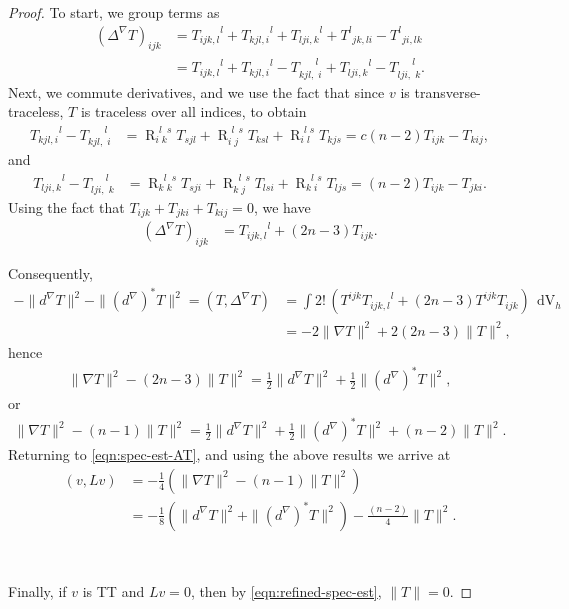 \documentclass[10pt,reqno]{amsart}
\DeclareMathOperator{\dvol}{dV}
\DeclareMathOperator{\R}{R}
\newcommand{\riem}{\R}
\newcommand{\riemdudu}[4]{\riem^{\phantom{#1} #2 \phantom{#3} #4}_{#1 \phantom{#2} #3}}
\begin{document}
\begin{proof}
To start, we group terms as 
\begin{align*}
(\Delta^\nabla T)_{ijk} &=   {T_{ijk,l}}^l + {T_{kjl,i}}^l + {T_{lji,k}}^l + {T^l}_{jk,li} -  {T^l}_{ji,lk} \nonumber \\
&=  {T_{ijk,l}}^l + {T_{kjl,i}}^l - T_{kjl,\phantom{l}i}^{\phantom{kjl,}l} + {T_{lji,k}}^l - T_{lji,\phantom{l}k}^{\phantom{lji,}l}.
\end{align*}
Next, we commute derivatives,  and we use the fact that since $v$ is transverse-traceless, $T$ is traceless over all indices, to obtain
\begin{align*}
{T_{kjl,i}}^l - T_{kjl,\phantom{l}i}^{\phantom{kjl,}l} &= \riemdudu{i}{l}{k}{s} T_{sjl} + \riemdudu{i}{l}{j}{s} T_{ksl} + \riemdudu{i}{l}{l}{s} T_{kjs} = c(n-2) T_{ijk} - T_{kij},
\end{align*}
and
\begin{align*}
{T_{lji,k}}^l - T_{lji,\phantom{l}k}^{\phantom{lji,}l} &= \riemdudu{k}{l}{k}{s} T_{sji} + \riemdudu{k}{l}{j}{s} T_{lsi} + \riemdudu{k}{l}{i}{s} T_{ljs} = (n-2) T_{ijk} - T_{jki}.
\end{align*}
Using the fact that $T_{ijk} + T_{jki} + T_{kij} = 0$, we have 
\begin{align*}
(\Delta^\nabla T)_{ijk} &=  {T_{ijk,l}}^l + (2n-3) T_{ijk}.
\end{align*}

Consequently, 
\begin{align*}
- \|d^\nabla T\|^2 - \|(d^\nabla)^* T\|^2 = (T,\Delta^\nabla T) &= \int 2! \, ( T^{ijk} {T_{ijk,l}}^l + (2n-3) T^{ijk} T_{ijk}  )\,  \dvol_h \nonumber \\
&= - 2 \| \nabla T \|^2 + 2 (2n-3) \|T\|^2,
\end{align*}
hence
\begin{align*}
\| \nabla T \|^2 - (2n-3) \|T\|^2 = \frac{1}{2} \|d^\nabla T\|^2 + \frac{1}{2} \|(d^\nabla)^*T\|^2, 
\end{align*}
or
\begin{align*}
\| \nabla T \|^2 - (n-1) \|T\|^2  = \frac{1}{2} \|d^\nabla T\|^2 + \frac{1}{2} \|(d^\nabla) ^*T\|^2 + (n-2) \|T\|^2. 
\end{align*}
Returning to \eqref{eqn:spec-est-AT}, and using the above results we arrive at
\begin{align} \label{eqn:refined-spec-est}
(v, Lv) &= -\frac{1}{4} ( \|\nabla T\|^2 - (n-1) \|T\|^2)  \nonumber \\
&= -\frac{1}{8} ( \|d^\nabla T\|^2 + \|(d^\nabla)^*T\|^2) - \frac{(n-2)}{4} \|T\|^2.
\end{align}

\ 

Finally, if $v$ is TT and $Lv = 0$, then by \eqref{eqn:refined-spec-est}, $\| T \| = 0$.  
\end{proof}
\end{document}
